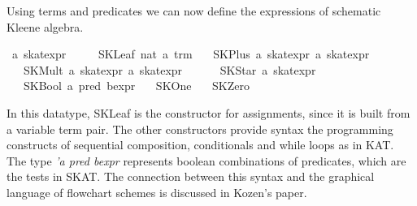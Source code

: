 \documentclass{llncs}
\begin{document}
Using terms and predicates we can now define the expressions of
schematic Kleene algebra.

\begin{isabellebody}
\isanewline
{}\isamarkupfalse%
\ {}a\ skat{}expr\ {}\isanewline
\ \ \ \ SKLeaf\ nat\ {}{}a\ trm{}\isanewline
\ \ {}\ SKPlus\ {}{}a\ skat{}expr{}\ {}{}a\ skat{}expr{}\ {}\ {}{}{}{}{}\ {}{}{}\isanewline
\ \ {}\ SKMult\ {}{}a\ skat{}expr{}\ {}{}a\ skat{}expr{}\ {}\ {}{}{}{}{}\ {}{}{}\isanewline
\ \ {}\ SKStar\ {}{}a\ skat{}expr{}\isanewline
\ \ {}\ SKBool\ {}{}a\ pred\ bexpr{}\isanewline
\ \ {}\ SKOne\isanewline
\ \ {}\ SKZero\isanewline
\end{isabellebody}

In this datatype, SKLeaf is the constructor for assignments, since it
is built from a variable term pair. The other constructors provide
syntax the programming constructs of sequential composition,
conditionals and while loops as in KAT. The type \textit{'a pred
  bexpr} represents boolean combinations of predicates, which are the
tests in SKAT. The connection between this syntax and the graphical
language of flowchart schemes is discussed in Kozen's paper.
\end{document}

